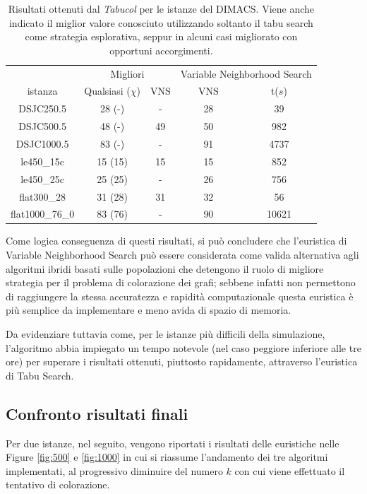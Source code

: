 \documentclass[a4paper,10pt]{article}
\newcommand{\tabucol}{\emph{Tabucol}}
\begin{document}
\begin{table}[h]
\begin{center}
\begin{tabular}{|c|c|c||c|c|}
\hline
                & \multicolumn{2}{c||}{Migliori} & \multicolumn{2}{c|}{Variable Neighborhood Search} \\
\cline{2-5}
istanza         &Qualsiasi ($\chi$)    &VNS  &VNS        &t($s$)   \\
\hline
DSJC250.5       & 28 (-)               &-   &28         &39        \\
DSJC500.5       & 48 (-)               &49  &50         &982       \\
DSJC1000.5      & 83 (-)               &-   &91         &4737        \\
le450\_15c      & 15 (15)              &15  &15         &852         \\
le450\_25c      & 25 (25)              &-   &26         &756        \\
flat300\_28     & 31 (28)              &31  &32         &56         \\
flat1000\_76\_0 & 83 (76)              &-   &90         &10621        \\
\hline
\end{tabular}
\caption{Risultati ottenuti dal \tabucol{} per le istanze del DIMACS. Viene anche indicato il miglior valore conosciuto utilizzando soltanto il tabu search come strategia esplorativa, seppur in alcuni casi \cite{tabucolimproved} migliorato con opportuni accorgimenti.}
\label{tab:vns}
\end{center}
\end{table}

Come logica conseguenza di questi risultati, si può concludere che l'euristica di Variable Neighborhood Search può essere considerata come valida alternativa agli algoritmi ibridi basati sulle popolazioni che detengono il ruolo di migliore strategia per il problema di colorazione dei grafi; sebbene infatti non permettono di raggiungere la stessa accuratezza e rapidità computazionale questa euristica è più semplice da implementare e meno avida di spazio di memoria. 

Da evidenziare tuttavia come, per le istanze più difficili della simulazione, l'algoritmo abbia impiegato un tempo notevole (nel caso peggiore inferiore alle tre ore) per superare i risultati ottenuti, piuttosto rapidamente, attraverso l'euristica di Tabu Search.

\subsection{Confronto risultati finali}
Per due istanze, nel seguito, vengono riportati i risultati delle euristiche nelle Figure \ref{fig:500} e \ref{fig:1000} in cui si riassume l'andamento dei tre algoritmi implementati, al progressivo diminuire del numero $k$ con cui viene effettuato il tentativo di colorazione. 
\end{document}
